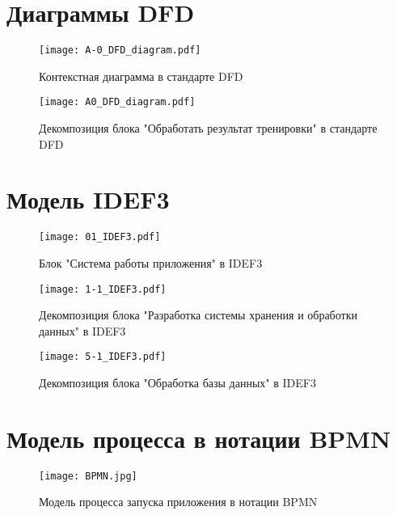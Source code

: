 \documentclass[14pt]{extreport}
\begin{document}
\begin{landscape}
\section{Диаграммы DFD}
\begin{figure}[H]
\centerline{\texttt{[image: A-0\_DFD\_diagram.pdf]}}
\caption{Контекстная диаграмма в стандарте DFD}
\label{fig11}
\end{figure}

\begin{figure}[H]
\centerline{\texttt{[image: A0\_DFD\_diagram.pdf]}}
\caption{Декомпозиция блока "Обработать результат тренировки"{} в стандарте DFD}
\label{fig12}
\end{figure}

\section{Модель IDEF3}

\begin{figure}[H]
\centerline{\texttt{[image: 01\_IDEF3.pdf]}}
\caption{Блок "Система работы приложения"{} в IDEF3}
\label{fig13}
\end{figure}

\begin{figure}[H]
\centerline{\texttt{[image: 1-1\_IDEF3.pdf]}}
\caption{Декомпозиция блока "Разработка системы хранения и обработки данных"{} в IDEF3}
\label{fig14}
\end{figure}

\begin{figure}[H]
\centerline{\texttt{[image: 5-1\_IDEF3.pdf]}}
\caption{Декомпозиция блока "Обработка базы данных"{} в IDEF3}
\label{fig15}
\end{figure}

\section{Модель процесса в нотации BPMN}

\begin{figure}[H]
\centerline{\texttt{[image: BPMN.jpg]}}
\caption{Модель процесса запуска приложения в нотации BPMN}
\label{fig16}
\end{figure}

\end{landscape}

\conclusions
\end{document}
